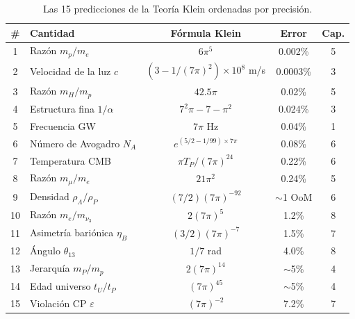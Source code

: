 \begin{table}[H]
\centering
\small
\begin{tabular}{clccc}
\toprule
\# & \textbf{Cantidad} & \textbf{Fórmula Klein} & \textbf{Error} & \textbf{Cap.} \\
\midrule
1 & Razón $m_p/m_e$ & $6\pi^5$ & 0.002\% & 5 \\
2 & Velocidad de la luz $c$ & $(3 - 1/(7\pi)^2) \times 10^8$ m/s & 0.0003\% & 3 \\
3 & Razón $m_H/m_p$ & $42.5\pi$ & 0.02\% & 5 \\
4 & Estructura fina $1/\alpha$ & $7^2\pi - 7 - \pi^2$ & 0.024\% & 3 \\
5 & Frecuencia GW & $7\pi$ Hz & 0.04\% & 1 \\
6 & Número de Avogadro $N_A$ & $e^{(5/2-1/99) \times 7\pi}$ & 0.08\% & 6 \\
7 & Temperatura CMB & $\pi T_P/(7\pi)^{24}$ & 0.22\% & 6 \\
8 & Razón $m_\mu/m_e$ & $21\pi^2$ & 0.24\% & 5 \\
9 & Densidad $\rho_\Lambda/\rho_P$ & $(7/2)(7\pi)^{-92}$ & $\sim$1 OoM & 6 \\
10 & Razón $m_e/m_{\nu_3}$ & $2(7\pi)^5$ & 1.2\% & 8 \\
11 & Asimetría bariónica $\eta_B$ & $(3/2)(7\pi)^{-7}$ & 1.5\% & 7 \\
12 & Ángulo $\theta_{13}$ & $1/7$ rad & 4.0\% & 8 \\
13 & Jerarquía $m_P/m_p$ & $2(7\pi)^{14}$ & $\sim$5\% & 4 \\
14 & Edad universo $t_U/t_P$ & $(7\pi)^{45}$ & $\sim$5\% & 4 \\
15 & Violación CP $\varepsilon$ & $(7\pi)^{-2}$ & 7.2\% & 7 \\
\bottomrule
\end{tabular}
\caption{Las 15 predicciones de la Teoría Klein ordenadas por precisión.}
\end{table}
